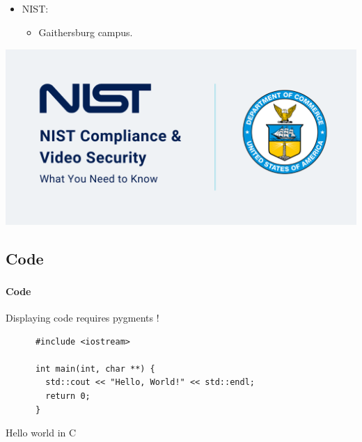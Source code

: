 \subsection{\slidetitle}
\begin{frame}
  \frametitle{\sectiontitle}
  \framesubtitle{\slidetitle}

  \begin{minipage}[h!]{0.45\textwidth}
    \begin{itemize}
      \item NIST:
      \begin{itemize}
        \item Gaithersburg campus.
      \end{itemize}
    \end{itemize}
  \end{minipage}\hfill
  \begin{minipage}[h!]{0.45\textwidth}
    \includegraphics[scale=0.2]{./img/example-image.png}
  \end{minipage}
\end{frame}

\def\slidetitle{Code}

\subsection{\slidetitle}
\begin{frame}[containsverbatim]
  \frametitle{\sectiontitle}
  \framesubtitle{\slidetitle}

  Displaying code requires pygments !

  \begin{listing}[H]
    \begin{verbatim}
      #include <iostream>

      int main(int, char **) {
        std::cout << "Hello, World!" << std::endl;
        return 0;
      }
    \end{verbatim}
    \caption{Hello world in C}
  \end{listing}

\end{frame}


